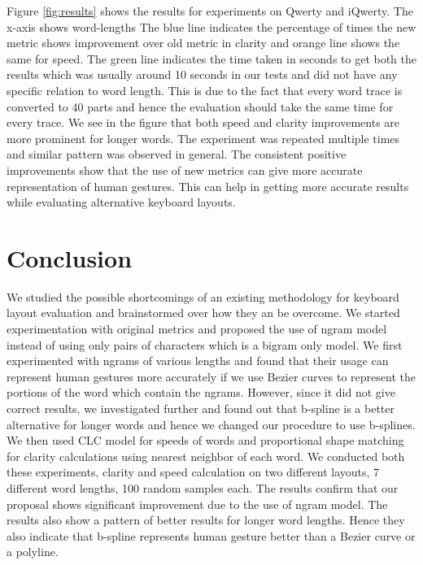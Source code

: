 \documentclass[MTech]{iitmdiss}
\begin{document}
Figure \ref{fig:results} shows the results for experiments on Qwerty and iQwerty. The x-axis shows word-lengths The blue line indicates the percentage of times the new metric shows improvement over old metric in clarity and orange line shows the same for speed. The green line indicates the time taken in seconds to get both the results which was usually around 10 seconds in our tests and did not have any specific relation to word length. This is due to the fact that every word trace is converted to 40 parts and hence the evaluation should take the same time for every trace.  We see in the figure that both speed and clarity improvements are more prominent for longer words. The experiment was repeated multiple times and similar pattern was observed in general. The consistent positive improvements show that the use of new metrics can give more accurate representation of human gestures. This can help in getting more accurate results while evaluating alternative keyboard layouts.

\chapter{Conclusion}
We studied the possible shortcomings of an existing methodology for keyboard layout evaluation and brainstormed over how they an be overcome. We started experimentation with original metrics and proposed the use of ngram model instead of using only pairs of characters which is a bigram only model. We first experimented with ngrams of various lengths and found that their usage can represent human gestures more accurately if we use Bezier curves to represent the portions of the word which contain the ngrams. However, since it did not give correct results, we investigated further and found out that b-spline is a better alternative for longer words and hence we changed our procedure to use b-splines. We then used CLC model for speeds of words and proportional shape matching for clarity calculations using nearest neighbor of each word. We conducted both these experiments, clarity and speed calculation on two different layouts, 7 different word lengths, 100 random samples each. The results confirm that our proposal shows significant improvement due to the use of ngram model. The results also show a pattern of better results for longer word lengths. Hence they also indicate that b-spline represents human gesture better than a Bezier curve or a polyline.
\end{document}
